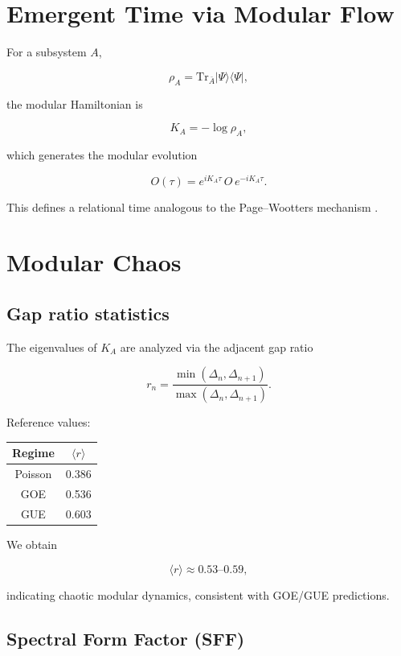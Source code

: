 \documentclass[11pt]{article}
\begin{document}
\section{Emergent Time via Modular Flow}

For a subsystem $A$,

\[
\rho_A = \mathrm{Tr}_{\bar A} |\Psi\rangle\langle\Psi|,
\]

the modular Hamiltonian is

\[
K_A = -\log\rho_A,
\]

which generates the modular evolution

\[
O(\tau)=e^{iK_A\tau}\,O\,e^{-iK_A\tau}.
\]

This defines a relational time analogous to the Page--Wootters
mechanism \cite{pagewootters}.

\section{Modular Chaos}

\subsection{Gap ratio statistics}

The eigenvalues of $K_A$ are analyzed via the adjacent gap ratio

\[
r_n=\frac{\min(\Delta_n,\Delta_{n+1})}{\max(\Delta_n,\Delta_{n+1})}.
\]

Reference values:

\begin{center}
\begin{tabular}{cc}
\toprule
Regime & $\langle r\rangle$ \\
\midrule
Poisson & 0.386 \\
GOE    & 0.536 \\
GUE    & 0.603 \\
\bottomrule
\end{tabular}
\end{center}

We obtain

\[
\langle r\rangle \approx 0.53\text{--}0.59,
\]

indicating chaotic modular dynamics, consistent with GOE/GUE predictions.

\subsection{Spectral Form Factor (SFF)}
\end{document}

